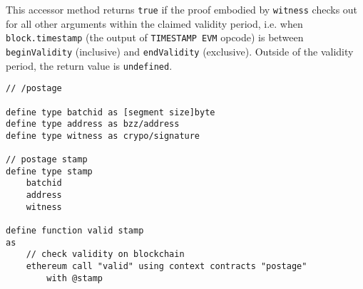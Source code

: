 This accessor method returns \lstinline{true} if the proof embodied by \lstinline{witness} checks out for all other arguments within the claimed 
validity period, i.e. when \lstinline{block.timestamp} (the output of \lstinline{TIMESTAMP EVM} opcode) is between \lstinline{beginValidity} (inclusive) and 
\lstinline{endValidity} (exclusive). Outside of the validity period, the return value is \lstinline{undefined}.
 

\begin{definition}\label{def:buzz-postage-stamp}
\begin{lstlisting}[language=buzz1]
// /postage

define type batchid as [segment size]byte  
define type address as bzz/address
define type witness as crypo/signature

// postage stamp
define type stamp  
    batchid
    address
    witness

define function valid stamp
as 
    // check validity on blockchain
    ethereum call "valid" using context contracts "postage"
        with @stamp
        
\end{lstlisting}
\end{definition}


